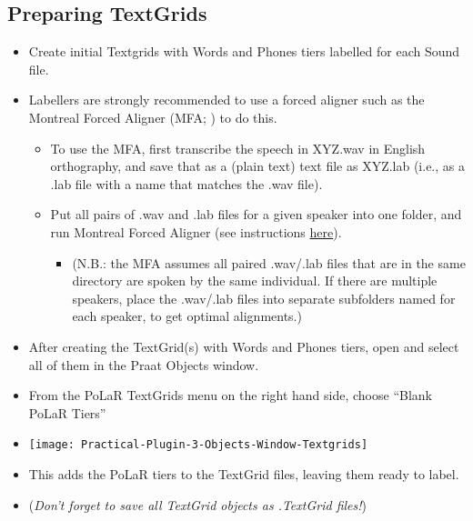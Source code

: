 \subsection{Preparing TextGrids}
	\begin{itemize}
		\item Create initial Textgrids with Words and Phones tiers labelled for each Sound file.
		\item Labellers are strongly recommended to use a forced aligner such as the Montreal Forced Aligner (MFA; \citealt{mcauliffe-19}) to do this.
		\begin{itemize}
			\item To use the MFA, first transcribe the speech in XYZ.wav in English orthography, and save that as a (plain text) text file as XYZ.lab (i.e., as a .lab file with a name that matches the .wav file).
			\item Put all pairs of .wav and .lab files for a given speaker into one folder, and run Montreal Forced Aligner (see instructions \href{https://montreal-forced-aligner.readthedocs.io/en/latest/aligning.html}{here}).
			\begin{itemize}
				\item (N.B.: the MFA assumes all paired .wav\slash .lab files that are in the same directory are spoken by the same individual. If there are multiple speakers, place the .wav\slash .lab files into separate subfolders named for each speaker, to get optimal alignments.)
			\end{itemize}
		\end{itemize}
		\item After creating the TextGrid(s) with Words and Phones tiers, open and select all of them in the Praat Objects window.
		\item From the PoLaR TextGrids menu on the right hand side, choose “Blank PoLaR Tiers”
		\item[] \texttt{[image: Practical-Plugin-3-Objects-Window-Textgrids]}
		\item This adds the PoLaR tiers to the TextGrid files, leaving them ready to label.
		\item (\textit{Don’t forget to save all TextGrid objects as .TextGrid files!})
	\end{itemize}

